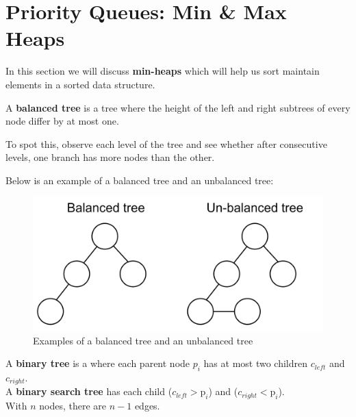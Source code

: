 \section{Priority Queues: Min \& Max Heaps}

\label{sec:priority_queues}

\noindent
In this section we will discuss \textbf{min-heaps} which will help us sort
maintain elements in a sorted data structure.

\label{sec:priority}
\begin{Def}

    A \textbf{balanced tree} is a tree where the height of the left and right subtrees of every node differ by at most one.
\end{Def}

\begin{Tip}
    To spot this, observe each level of the tree and see whether after consecutive levels, one branch has more nodes than the other.
\end{Tip}
\newpage
\noindent
Below is an example of a balanced tree and an unbalanced tree:

\begin{figure}[h!]
    \centering
    \includegraphics[width=.6\textwidth]{./Sections/sched/priority/tree.png}
    \caption{Examples of a balanced tree and an unbalanced tree}
    \label{fig:balanced_unbalanced_trees}
\end{figure}
\begin{Def}

    A \textbf{binary tree} is a where each parent node $p_i$ has at most two children $c_{left}$ and $c_{right}$.\\
    A \textbf{binary search tree} has each child ($c_{left} > \text{p}_{i}$) and ($c_{right} < \text{p}_{i}$).\\

    \noindent
    With $n$ nodes, there are $n-1$ edges.
\end{Def}

